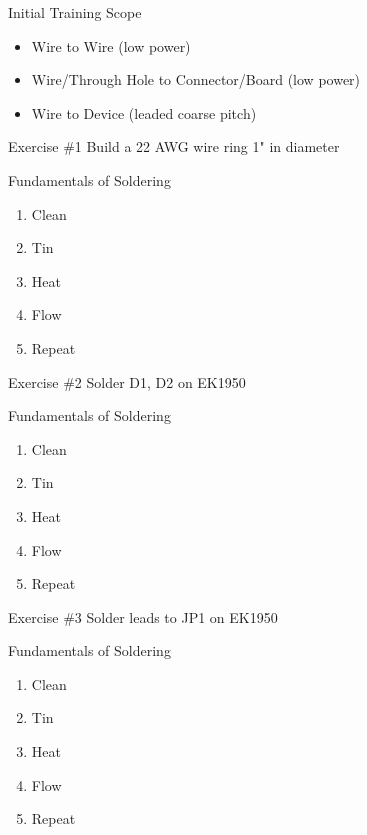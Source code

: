 \documentclass[aspectratio=169]{beamer}
\begin{document}
\begin{frame}{Initial Training Scope}
    \begin{itemize}
        \item Wire to Wire (low power)
        \item Wire/Through Hole to Connector/Board (low power)
        \item Wire to Device (leaded coarse pitch)
    \end{itemize}
\end{frame}
\begin{frame}{Exercise \#1}
    Build a 22 AWG wire ring 1" in diameter
\end{frame}
\begin{frame}{Fundamentals of Soldering}
    \begin{enumerate}
        \item Clean
        \item Tin
        \item Heat
        \item Flow
        \item Repeat
    \end{enumerate}
\end{frame}
\begin{frame}{Exercise \#2}
    Solder D1, D2 on EK1950
\end{frame}
\begin{frame}{Fundamentals of Soldering}
    \begin{enumerate}
        \item Clean
        \item Tin
        \item Heat
        \item Flow
        \item Repeat
    \end{enumerate}
\end{frame}
\begin{frame}{Exercise \#3}
    Solder leads to JP1 on EK1950
\end{frame}
\begin{frame}{Fundamentals of Soldering}
    \begin{enumerate}
        \item Clean
        \item Tin
        \item Heat
        \item Flow
        \item Repeat
    \end{enumerate}
\end{frame}
\end{document}
